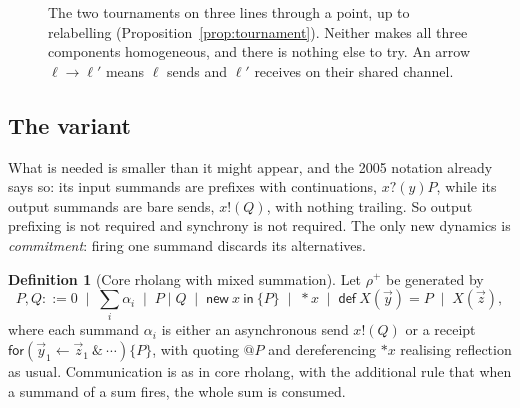 \documentclass[11pt]{article}
\theoremstyle{plain}
\theoremstyle{definition}
\newtheorem{definition}[theorem]{Definition}
\theoremstyle{remark}
\begin{document}
\begin{figure}[t]
\centering
{}
\caption{The two tournaments on three lines through a point, up to relabelling
(Proposition~\ref{prop:tournament}). Neither makes all three components homogeneous, and
there is nothing else to try. An arrow $\ell \to \ell'$ means $\ell$ sends and $\ell'$
receives on their shared channel.}
\label{fig:tournament}
\end{figure}

\subsection{The variant}

What is needed is smaller than it might appear, and the 2005 notation already says so: its
input summands are prefixes with continuations, $x?(y)P$, while its output summands are
bare sends, $x!(Q)$, with nothing trailing. So output prefixing is not required and
synchrony is not required. The only new dynamics is \emph{commitment}: firing one summand
discards its alternatives.

\begin{definition}[Core rholang with mixed summation]
\label{def:variant}
Let $\rho^{+}$ be generated by
\[
P,Q ::= 0 \;\mid\; \textstyle\sum_{i} \alpha_i \;\mid\; P \mid Q \;\mid\;
\mathsf{new}\ x\ \mathsf{in}\ \{P\} \;\mid\; {*}x \;\mid\;
\mathsf{def}\ X(\vec y) = P \;\mid\; X(\vec z),
\]
where each summand $\alpha_i$ is either an asynchronous send $x!(Q)$ or a receipt
$\mathsf{for}(\vec y_1 \leftarrow \vec z_1\ \&\ \cdots)\{P\}$, with quoting $@P$ and
dereferencing ${*}x$ realising reflection as usual. Communication is as in core rholang,
with the additional rule that when a summand of a sum fires, the whole sum is consumed.
\end{definition}
\end{document}
